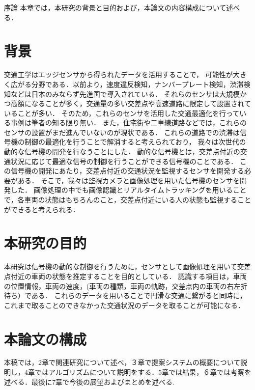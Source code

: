 \chapterhead
{序論}
{本章では，本研究の背景と目的および，本論文の内容構成について述べる．}

\section{背景}
交通工学はエッジセンサから得られたデータを活用することで，
可能性が大きく広がる分野である．以前より，速度違反検知，ナンバープレート検知，渋滞検知などは日本のみならず先進国で導入されている．
それらのセンサは大規模かつ高額になることが多く，交通量の多い交差点や高速道路に限定して設置されていることが多い．
そのため，これらのセンサを活用した交通最適化を行っている事例は筆者の知る限り無い．
また，住宅街や二車線道路などでは，これらのセンサの設置がまだ進んでいないのが現状である．
これらの道路での渋滞は信号機の制御の最適化を行うことで解消すると考えられており，
我々は次世代の動的な信号機の開発を行なうことにした．
動的な信号機とは，交差点付近の交通状況に応じて最適な信号の制御を行うことができる信号機のことである．
この信号機の開発にあたり，交差点付近の交通状況を監視するセンサを開発する必要がある．
そこで，我々は監視カメラと画像処理を用いた信号機のセンサを開発した．
画像処理の中でも画像認識とリアルタイムトラッキングを用いることで，各車両の状態はもちろんのこと，交差点付近にいる人の状態も監視することができると考えられる．%


\section{本研究の目的}
本研究は信号機の動的な制御を行うために，センサとして画像処理を用いて交差点付近の車両の状態を推定することを目的としている．
認識する項目は，車両の位置情報，車両の速度，(車両の種類，車両の軌跡，交差点内の車両の右左折待ち）である．%
これらのデータを用いることで円滑な交通に繋がると同時に，これまで取ることのできなかった交通状況のデータを取ることが可能になる．

\section{本論文の構成}
本稿では，2章で関連研究について述べ，３章で提案システムの概要について説明し，4章ではアルゴリズムについて説明をする．5章では結果，６章では考察を述べる．最後に7章で今後の展望およびまとめを述べる.


\newpage
